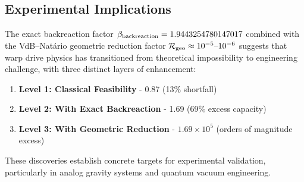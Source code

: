 \documentclass[11pt]{article}
\begin{document}
\subsection*{Experimental Implications}

The exact backreaction factor $\beta_{\rm backreaction}=1.9443254780147017$ combined with the VdB–Natário geometric reduction factor $\mathcal{R}_{\rm geo}\approx10^{-5}\text{–}10^{-6}$ suggests that warp drive physics has transitioned from theoretical impossibility to engineering challenge, with three distinct layers of enhancement:

\begin{enumerate}
\item \textbf{Level 1: Classical Feasibility} - 0.87 (13\% shortfall)
\item \textbf{Level 2: With Exact Backreaction} - 1.69 (69\% excess capacity) 
\item \textbf{Level 3: With Geometric Reduction} - $1.69\times10^5$ (orders of magnitude excess)
\end{enumerate}

These discoveries establish concrete targets for experimental validation, particularly in analog gravity systems and quantum vacuum engineering.
\end{document}
